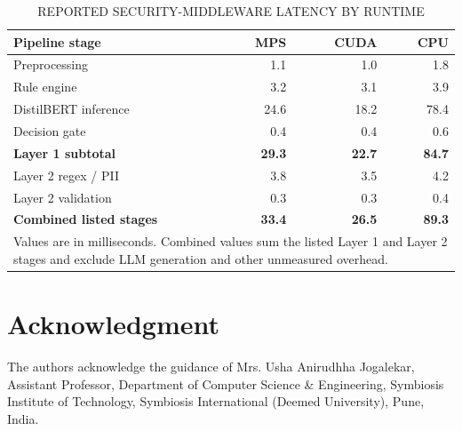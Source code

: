 \documentclass[conference]{IEEEtran}
\begin{document}
\begin{table}[t]
\caption{REPORTED SECURITY-MIDDLEWARE LATENCY BY RUNTIME}
\label{tab:latency}
\centering
\begin{tabular}{lrrr}
\toprule
\textbf{Pipeline stage} & \textbf{MPS} & \textbf{CUDA} & \textbf{CPU} \\
\midrule
Preprocessing & 1.1 & 1.0 & 1.8 \\
Rule engine & 3.2 & 3.1 & 3.9 \\
DistilBERT inference & 24.6 & 18.2 & 78.4 \\
Decision gate & 0.4 & 0.4 & 0.6 \\
\textbf{Layer 1 subtotal} & \textbf{29.3} & \textbf{22.7} & \textbf{84.7} \\
Layer 2 regex / PII & 3.8 & 3.5 & 4.2 \\
Layer 2 validation & 0.3 & 0.3 & 0.4 \\
\textbf{Combined listed stages} & \textbf{33.4} & \textbf{26.5} & \textbf{89.3} \\
\bottomrule
\multicolumn{4}{p{0.45\textwidth}}{\footnotesize Values are in milliseconds. Combined values sum the listed Layer 1 and Layer 2 stages and exclude LLM generation and other unmeasured overhead.}
\end{tabular}
\end{table}

\section*{Acknowledgment}
The authors acknowledge the guidance of Mrs. Usha Anirudhha Jogalekar, Assistant Professor, Department of Computer Science \& Engineering, Symbiosis Institute of Technology, Symbiosis International (Deemed University), Pune, India.
\end{document}
